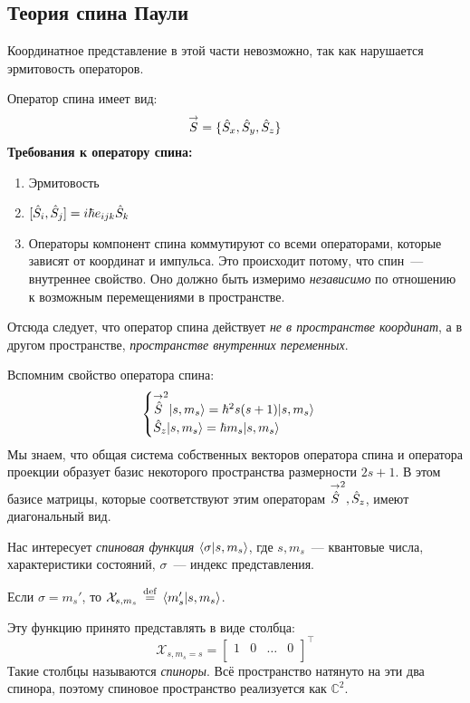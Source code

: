 \subsection{Теория спина Паули}
Координатное представление в этой части невозможно, так как нарушается эрмитовость операторов.

Оператор спина имеет вид:
$$
    \vec S = \{ \Hat S_x, \Hat S_y, \Hat S_z \}
$$
\textbf{Требования к оператору спина:}
\begin{enumerate}
  \item Эрмитовость
  \item $[\Hat S_i, \Hat S_j] = i \hbar e_{ijk} \Hat S_k$
  \item Операторы компонент спина коммутируют со всеми операторами, которые зависят от координат и импульса. Это происходит потому, что спин~--- внутреннее свойство. Оно должно быть измеримо \emph{независимо} по отношению к возможным перемещениями в пространстве.
\end{enumerate}
Отсюда следует, что оператор спина действует \emph{не в пространстве координат}, а в другом пространстве, \emph{пространстве внутренних переменных}.

Вспомним свойство оператора спина:
\begingroup
\def \Ssq {\vec {\Hat S}^2}
\def \Sz {\Hat S_z}
$$
    \begin{cases}
        \Ssq \qu{s, m_s} = \hbar^2 s (s+1) \qu{s, m_s}\\
        \Sz \qu{s, m_s} = \hbar m_s \qu{s, m_s}\\
    \end{cases}
$$
Мы знаем, что общая система собственных векторов оператора спина и оператора проекции образует базис некоторого пространства размерности $2s + 1$. В этом базисе матрицы, которые соответствуют этим операторам $\Ssq, \Sz$, имеют диагональный вид.

Нас интересует \emph{спиновая функция} $\qs{\sigma}{s, m_s}$, где $s, m_s$~--- квантовые числа, характеристики состояний, $\sigma$~--- индекс представления.

\def \X {\mathcal{X}}

Если $\sigma = m_s'$, то $\X_{s, m_s} \eqdef \qs{m_s'}{s, m_s}$.

Эту функцию принято представлять в виде столбца:
$$
    \X_{s, m_s = s} = \begin{bmatrix}
                        1 & 0 & \ldots & 0 \\
                      \end{bmatrix}^\top
$$
Такие столбцы называются \emph{спиноры}. Всё пространство натянуто на эти два спинора, поэтому спиновое пространство реализуется как $\mathbb{C}^2$.


